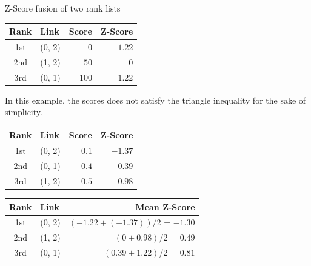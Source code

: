 \begin{example}
  \caption{Z-Score fusion of two rank lists}
  \label{ex:z_score_fusion}

  \begin{subexample}{\linewidth}
    \centering
    \begin{tabular}{c l r r}
      \toprule
      Rank & Link & Score & Z-Score \\
      \midrule
      1st & (0, 2) & $0$ & $-1.22$ \\
      2nd & (1, 2) & $50$ & $0$ \\
      3rd & (0, 1) & $100$ & $1.22$ \\
      \bottomrule
    \end{tabular}
  \end{subexample}

  \vspace{0.5cm}

  In this example, the scores does not satisfy the triangle inequality for the sake of simplicity.

  \vspace{0.5cm}

  \begin{subexample}{\linewidth}
    \centering
    \begin{tabular}{c l r r}
      \toprule
      Rank & Link & Score & Z-Score \\
      \midrule
      1st & (0, 2) & $0.1$ & $-1.37$ \\
      2nd & (0, 1) & $0.4$ & $0.39$ \\
      3rd & (1, 2) & $0.5$ & $0.98$ \\
      \bottomrule
    \end{tabular}
  \end{subexample}

  \vspace{0.5cm}

  \begin{subexample}{\linewidth}
    \centering
    \begin{tabular}{c l r}
      \toprule
      Rank & Link & Mean Z-Score \\
      \midrule
      1st & (0, 2) & $(-1.22 + (-1.37)) / 2$ = $-1.30$ \\
      2nd & (1, 2) & $(0 + 0.98) / 2$ = $0.49$ \\
      3rd & (0, 1) & $(0.39 + 1.22) / 2$ = $0.81$ \\
      \bottomrule
    \end{tabular}
  \end{subexample}

\end{example}

